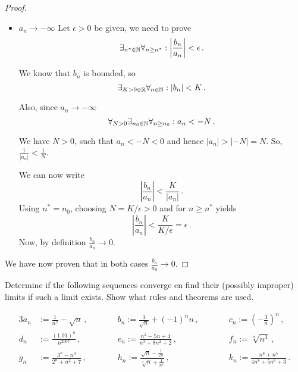 \documentclass[week=3]{homework}
\begin{document}
\begin{questions}
\begin{parts}
\begin{proof}
\begin{itemize}
	    			\item $a_n \to - \infty$
	    			Let $\epsilon > 0$ be given, we need to prove
	    			\[
		    			\exists_{n^* \in \naturals} \forall_{n \ge n^*}: \left| \frac{b_n}{a_n} \right| < \epsilon\,.
	    			\]
	    			
		    		We know that $b_n$ is bounded, so
		    		\[
			    		\exists_{K > 0 \in \mathbb{R}} \forall_{n \in \mathbb{N}}: |b_n| < K\,.
		    		\]
		    		
		    		Also, since $a_n \to -\infty$
		    		\[
			    		\forall_{N > 0} \exists_{n_0 \in \mathbb{N}} \forall_{n \ge n_0}: a_n < -N\,.
		    		\]
		    		
		    		We have $N > 0$, such that $a_n < -N < 0$ and hence $|a_n| > |-N| = N$. So, $\frac{1}{|a_n|} < \frac{1}{N}$.
		    		
		    		We can now write
		    		\[
			    		\left|\frac{b_n}{a_n}\right| < \frac{K}{|a_n|}\,.
		    		\]
		    		Using $n^* = n_0$, choosing $N = K/\epsilon > 0$ and for $n \geq n^*$ yields 
		    		\[
			    		\left|\frac{b_n}{a_n}\right| < \frac{K}{K/\epsilon} = \epsilon\,.
		    		\]
		    		Now, by definition $\frac{b_n}{a_n} \to 0$.
	    		\end{itemize}
	    		
	    		We have now proven that in both cases $\frac{b_n}{a_n} \to 0$.
	    	\end{proof}
	    \end{parts}
    
	    \question
	    Determine if the following sequences converge en find their (possibly improper) limits if such a limit exists. Show what rules and theorems are used.
	    
	    \begin{alignat*}{3}
	    a_n &:= \frac{1}{n^2} - \sqrt n\,,  \qquad &&b_n := \frac{1}{\sqrt n } + (-1)^nn\,,\qquad &&c_n := \left(-\frac{3}{n}\right)^n\,, \\
	    d_n &:= \frac{(1.01)^n}{n^{2007}}\,, \qquad &&e_n := \frac{n^2-5n+4}{n^3+8n^2+2}\,, \qquad &&f_n := \sqrt[n]{n^3}\,, \\
	    g_n &:= \frac{3^n - n^3}{2^n + n^2 + 7}\,, \qquad &&h_n := \frac{\sqrt n - \frac{1}{2n}}{\sqrt[3]{n} + \frac{1}{n^2}}\,, \qquad &&k_n := \frac{n^8 + n^5}{4n^8 + 5n^6 + 3}\,.
	    \end{alignat*}
	    

\end{questions}
\end{document}
